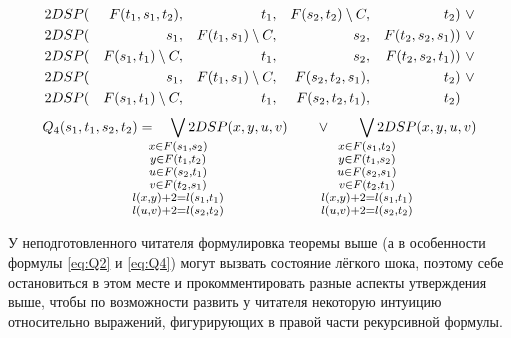 \begin{theorem}
\begin{enumerate}
\begin{align}
    2DSP(&& F(t_1, s_1, t_2) ,&& t_1              ,&& F(s_2, t_2) \setminus C,&& t_2              &)~\vee \\
    2DSP(&& s_1              ,&& F(t_1, s_1) \setminus C,&& s_2              ,&& F(t_2, s_2, s_1) &)~\vee \\
    2DSP(&& F(s_1, t_1) \setminus C,&& t_1              ,&& s_2              ,&& F(t_2, s_2, t_1) &)~\vee \\
    2DSP(&& s_1              ,&& F(t_1, s_1) \setminus C,&& F(s_2, t_2, s_1) ,&& t_2              &)~\vee \\
    2DSP(&& F(s_1, t_1) \setminus C,&& t_1              ,&& F(s_2, t_2, t_1) ,&& t_2              &) \label{eq:Q2}
\end{align}
\begin{align}
    Q_4(s_1, t_1, s_2, t_2) = \quad
        \smashoperator{\bigvee_{
        \large \substack{
            x \in F(s_1, s_2)\\ 
            y \in F(t_1, t_2)\\ 
            u \in F(s_2, t_1)\\ 
            v \in F(t_2, s_1)\\ 
            l(x, y) + 2 = l(s_1, t_1)\\ 
            l(u, v) + 2 = l(s_2, t_2)
        }
        }} 2DSP(x, y, u, v)
        \quad\quad\vee\quad\quad
        \smashoperator{\bigvee_{
        \large \substack{
            x \in F(s_1, t_2)\\ 
            y \in F(t_1, s_2)\\ 
            u \in F(s_2, s_1)\\ 
            v \in F(t_2, t_1)\\ 
            l(x, y) + 2 = l(s_1, t_1)\\ 
            l(u, v) + 2 = l(s_2, t_2)
        }
        }} 2DSP(x, y, u, v) \label{eq:Q4} \\
\end{align}
\end{enumerate}
\end{theorem}

У неподготовленного читателя формулировка теоремы выше (а в особенности формулы \eqref{eq:Q2} и \eqref{eq:Q4}) могут вызвать состояние лёгкого шока, поэтому себе остановиться в этом месте и прокомментировать разные аспекты утверждения выше, чтобы по возможности развить у читателя некоторую интуицию относительно выражений, фигурирующих в правой части рекурсивной формулы.

